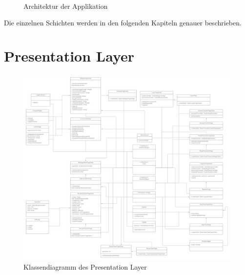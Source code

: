 \documentclass[parskip=full]{scrartcl}
\begin{document}
\begin{figure}[htp]
    \caption{Architektur der Applikation}
    \label{fig:struktur}
\end{figure}

Die einzelnen Schichten werden in den folgenden Kapiteln genauer beschrieben.

\newpage
\section{Presentation Layer}
\begin{figure}[htp]
    \centering
    \includegraphics[width = \textwidth]{images/presentationLayer/presentationLayer.png}
    \caption{Klassendiagramm des Presentation Layer}
    \label{fig:presentation-layer}
\end{figure}
    \newpage
\end{document}
